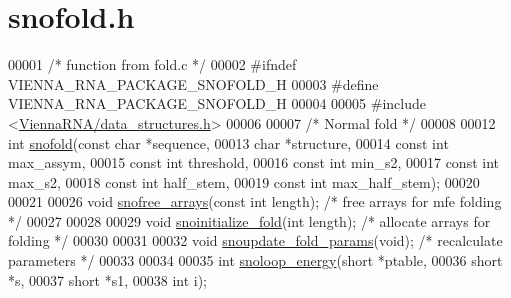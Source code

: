 \hypertarget{snofold_8h_source}{}\section{snofold.\+h}
\label{snofold_8h_source}

\begin{DoxyCode}
00001 \textcolor{comment}{/* function from fold.c */}
00002 \textcolor{preprocessor}{#ifndef VIENNA\_RNA\_PACKAGE\_SNOFOLD\_H}
00003 \textcolor{preprocessor}{#define VIENNA\_RNA\_PACKAGE\_SNOFOLD\_H}
00004 
00005 \textcolor{preprocessor}{#include <\mbox{\hyperlink{data__structures_8h}{ViennaRNA/data\_structures.h}}>}
00006 
00007 \textcolor{comment}{/* Normal fold */}
00008 
00012 \textcolor{keywordtype}{int}  \mbox{\hyperlink{snofold_8h_a54b7d4cc4aa9c2d165be4626ca799831}{snofold}}(\textcolor{keyword}{const} \textcolor{keywordtype}{char} *sequence,
00013              \textcolor{keywordtype}{char}       *structure,
00014              \textcolor{keyword}{const} \textcolor{keywordtype}{int}  max\_assym,
00015              \textcolor{keyword}{const} \textcolor{keywordtype}{int}  threshold,
00016              \textcolor{keyword}{const} \textcolor{keywordtype}{int}  min\_s2,
00017              \textcolor{keyword}{const} \textcolor{keywordtype}{int}  max\_s2,
00018              \textcolor{keyword}{const} \textcolor{keywordtype}{int}  half\_stem,
00019              \textcolor{keyword}{const} \textcolor{keywordtype}{int}  max\_half\_stem);
00020 
00021 
00026 \textcolor{keywordtype}{void}   \mbox{\hyperlink{snofold_8h_a8020f3ccd30d0b7ade53cbb08f386133}{snofree\_arrays}}(\textcolor{keyword}{const} \textcolor{keywordtype}{int} length);  \textcolor{comment}{/* free arrays for mfe folding */}
00027 
00028 
00029 \textcolor{keywordtype}{void}   \mbox{\hyperlink{snofold_8h_a4396715172d0f8d3baf1fdc3ec7859e6}{snoinitialize\_fold}}(\textcolor{keywordtype}{int} length);    \textcolor{comment}{/* allocate arrays for folding */}
00030 
00031 
00032 \textcolor{keywordtype}{void}   \mbox{\hyperlink{snofold_8h_a2dd5ca78afbfeb421d7ae8a2f63150ca}{snoupdate\_fold\_params}}(\textcolor{keywordtype}{void});       \textcolor{comment}{/* recalculate parameters */}
00033 
00034 
00035 \textcolor{keywordtype}{int}    \mbox{\hyperlink{snofold_8h_a9815482804bf292565020b8202f11a6d}{snoloop\_energy}}(\textcolor{keywordtype}{short} *ptable,
00036                       \textcolor{keywordtype}{short} *s,
00037                       \textcolor{keywordtype}{short} *s1,
00038                       \textcolor{keywordtype}{int}   i);

\end{DoxyCode}
